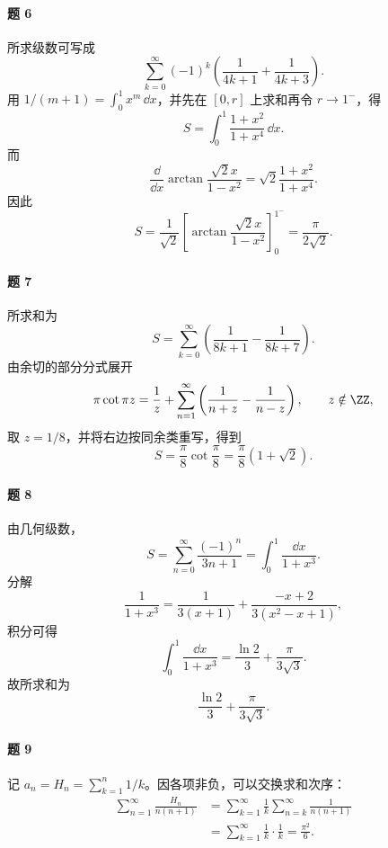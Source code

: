 \paragraph{题 6}
\begin{xsolution}
所求级数可写成
\[
  \sum_{k=0}^{\infty}(-1)^k
  \left(\frac1{4k+1}+\frac1{4k+3}\right).
\]
用 $1/(m+1)=\int_0^1x^m\,\dd x$，并先在 $[0,r]$ 上求和再令 $r\to1^-$，得
\[
  S=\int_0^1\frac{1+x^2}{1+x^4}\,\dd x.
\]
而
\[
  \frac{\dd}{\dd x}\arctan\frac{\sqrt2x}{1-x^2}
  =\sqrt2\frac{1+x^2}{1+x^4}.
\]
因此
\[
  S=\frac1{\sqrt2}\left[\arctan\frac{\sqrt2x}{1-x^2}\right]_{0}^{1^-}
  =\frac{\pi}{2\sqrt2}.
\]
\end{xsolution}

\paragraph{题 7}
\begin{xsolution}
所求和为
\[
  S=\sum_{k=0}^{\infty}\left(\frac1{8k+1}-\frac1{8k+7}\right).
\]
由余切的部分分式展开
\[
  \pi\cot\pi z
  =\frac1z+\sum_{n=1}^{\infty}
  \left(\frac1{n+z}-\frac1{n-z}\right),
  \qquad z\notin\ZZ,
\]
取 $z=1/8$，并将右边按同余类重写，得到
\[
  S=\frac\pi8\cot\frac\pi8
  =\frac\pi8(1+\sqrt2).
\]
\end{xsolution}

\paragraph{题 8}
\begin{xsolution}
由几何级数，
\[
  S=\sum_{n=0}^{\infty}\frac{(-1)^n}{3n+1}
  =\int_0^1\frac{\dd x}{1+x^3}.
\]
分解
\[
  \frac1{1+x^3}=\frac1{3(x+1)}+\frac{-x+2}{3(x^2-x+1)},
\]
积分可得
\[
  \int_0^1\frac{\dd x}{1+x^3}
  =\frac{\ln2}{3}+\frac{\pi}{3\sqrt3}.
\]
故所求和为
\[
  \frac{\ln2}{3}+\frac{\pi}{3\sqrt3}.
\]
\end{xsolution}

\paragraph{题 9}
\begin{xsolution}
记 $a_n=H_n=\sum_{k=1}^n1/k$。因各项非负，可以交换求和次序：
\[
\begin{aligned}
  \sum_{n=1}^{\infty}\frac{H_n}{n(n+1)}
  &=\sum_{k=1}^{\infty}\frac1k
    \sum_{n=k}^{\infty}\frac1{n(n+1)}\\
  &=\sum_{k=1}^{\infty}\frac1k\cdot\frac1k
  =\frac{\pi^2}{6}.
\end{aligned}
\]
\end{xsolution}

